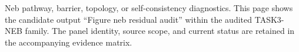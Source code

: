 Neb pathway, barrier, topology, or self-consistency diagnostics. This page shows the candidate output ``Figure neb residual audit'' within the audited TASK3-NEB family. The panel identity, source scope, and current status are retained in the accompanying evidence matrix.
